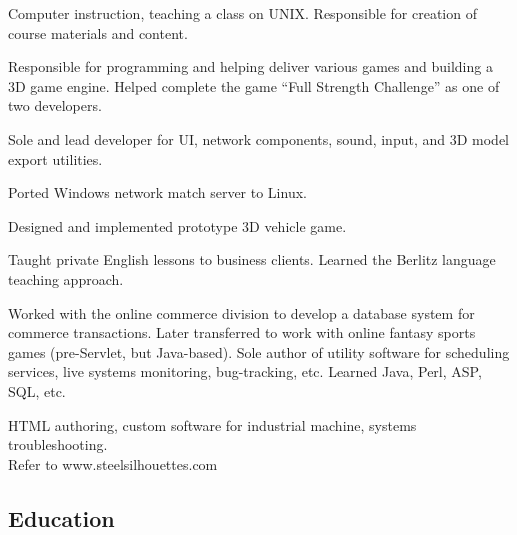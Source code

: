 \documentclass{article}
\begin{document}
  
Computer instruction, teaching a class on UNIX. Responsible for creation
of course materials and content.

  
Responsible for programming and helping deliver various games and
building a 3D game engine.  Helped complete the game ``Full Strength
Challenge'' as one of two developers.
\begin{items}
\item Sole and lead developer for UI, network components, sound, input,
and 3D model export utilities.
\item Ported Windows network match server to Linux.
\item Designed and implemented prototype 3D vehicle game.
\end{items}

  
Taught private English lessons to business clients.  Learned the Berlitz
language teaching approach.

  
Worked with the online commerce division to develop a database system for
commerce transactions. Later transferred to work with online fantasy sports
games (pre-Servlet, but Java-based). Sole author of utility software for
scheduling services, live systems monitoring, bug-tracking, etc.  Learned Java,
Perl, ASP, SQL, etc.

 
HTML authoring, custom software for industrial machine, systems
troubleshooting. \\ Refer to www.\-steelsilhouettes.\-com



\subsection*{Education}
\end{document}
